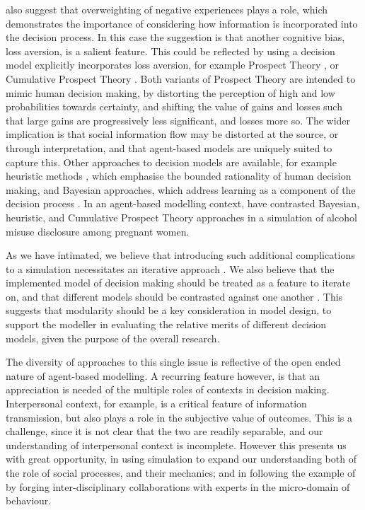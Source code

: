\documentclass{article}
\begin{document}
\citeauthor{McKenzie2013} also suggest that overweighting of negative experiences plays a role, which demonstrates the importance of considering how information is incorporated into the decision process. In this case the suggestion is that another cognitive bias, loss aversion, is a salient feature. This could be reflected by using a decision model explicitly incorporates loss aversion, for example Prospect Theory \citep{Kahneman1979}, or Cumulative Prospect Theory \citep{Tversky1992}. Both variants of Prospect Theory are intended to mimic human decision making, by distorting the perception of high and low probabilities towards certainty, and shifting the value of gains and losses such that large gains are progressively less significant, and losses more so. 
The wider implication is that social information flow may be distorted at the source, or through interpretation, and that agent-based models are uniquely suited to capture this.  Other approaches to decision models are available, for example heuristic methods \citep{Gigerenzer1996}, which emphasise the bounded rationality of human decision making, and Bayesian approaches, which address learning as a component of the decision process \citep{Robbins1964}. In an agent-based modelling context, \citet{Gray2016} have contrasted Bayesian, heuristic, and Cumulative Prospect Theory approaches in a simulation of alcohol misuse disclosure among pregnant women.

As we have intimated, we believe that introducing such additional complications to a simulation necessitates an iterative approach \citep{Cioffi-Revilla2010}. We also believe that the implemented model of decision making should be treated as a feature to iterate on, and that different models should be contrasted against one another \citep{Rossiter2014}. This suggests that modularity should be a key consideration in model design, to support the modeller in evaluating the relative merits of different decision models, given the purpose of the overall research.

The diversity of approaches to this single issue is reflective of the open ended nature of agent-based modelling. A recurring feature however, is that an appreciation is needed of the multiple roles of contexts in decision making. Interpersonal context, for example, is a critical feature of information transmission, but also plays a role in the subjective value of outcomes. This is a challenge, since it is not clear that the two are readily separable, and our understanding of interpersonal context is incomplete.
However this presents us with great opportunity, in using simulation to expand our understanding both of the role of social processes, and their mechanics; and in following the example of \citeauthor{Tversky1992} by forging inter-disciplinary collaborations with experts in the micro-domain of behaviour.
\end{document}
